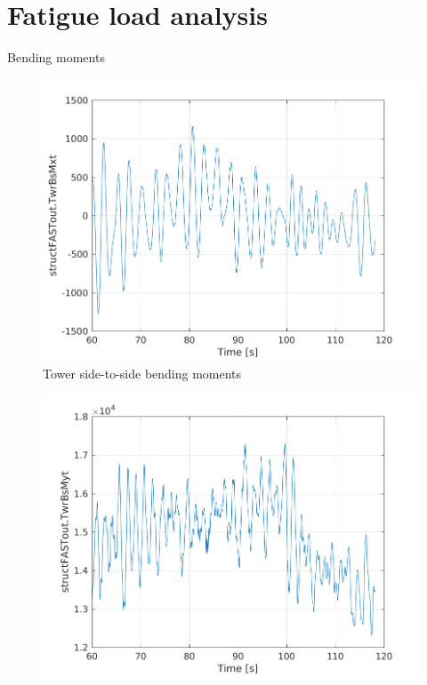 \documentclass[12pt,t]{beamer}
\begin{document}
\section{Fatigue load analysis}

\begin{frame}
\huge
Bending moments

\begin{figure}[H]
  \centering
\begin{minipage}{0.38\textwidth}
  \centering
  \includegraphics[width=1\linewidth]{../CIP_6/FAST/Plots_ws5/TwrBsMxt.png} \\
  \tiny
  Tower side-to-side bending moments
\end{minipage}
\begin{minipage}{0.38\textwidth}
  \centering
  \includegraphics[width=1\linewidth]{../CIP_6/FAST/Plots_ws5/TwrBsMyt.png} \\

\end{minipage}
\end{figure}
\end{frame}
\end{document}
